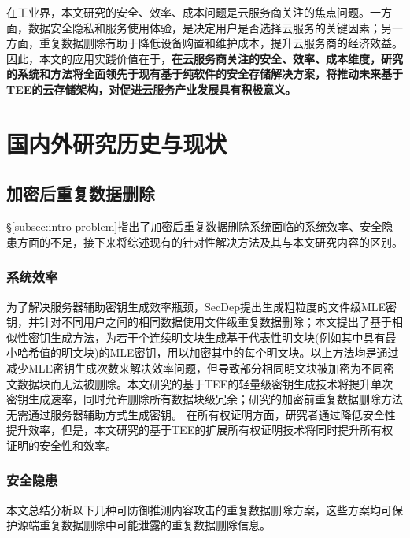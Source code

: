 在工业界，本文研究的安全、效率、成本问题是云服务商关注的焦点问题。一方面，数据安全隐私和服务使用体验，是决定用户是否选择云服务的关键因素；另一方面，重复数据删除有助于降低设备购置和维护成本，提升云服务商的经济效益。因此，本文的应用实践价值在于，\textbf{在云服务商关注的安全、效率、成本维度，研究的系统和方法将全面领先于现有基于纯软件的安全存储解决方案，将推动未来基于TEE的云存储架构，对促进云服务产业发展具有积极意义。}

\section{国内外研究历史与现状}
\label{sec:compare}

\subsection{加密后重复数据删除}
\label{subsec:compare-deduplication}

\S\ref{subsec:intro-problem}指出了加密后重复数据删除系统面临的系统效率、安全隐患方面的不足，接下来将综述现有的针对性解决方法及其与本文研究内容的区别。

\subsubsection{系统效率}
\label{subsubsec:compare-deduplication-performance}

为了解决服务器辅助密钥生成效率瓶颈，SecDep\cite{zhou2015secdep}提出生成粗粒度的文件级MLE密钥，并针对不同用户之间的相同数据使用文件级重复数据删除；本文提出了基于相似性密钥生成方法\cite{qin17}，为若干个连续明文块生成基于代表性明文块(例如其中具有最小哈希值的明文块)的MLE密钥，用以加密其中的每个明文块。以上方法均是通过减少MLE密钥生成次数来解决效率问题，但导致部分相同明文块被加密为不同密文数据块而无法被删除。本文研究的基于TEE的轻量级密钥生成技术将提升单次密钥生成速率，同时允许删除所有数据块级冗余；研究的加密前重复数据删除方法无需通过服务器辅助方式生成密钥。
在所有权证明方面，研究者通过降低安全性提升效率\cite{xu2013weak,pietro12}，但是，本文研究的基于TEE的扩展所有权证明技术将同时提升所有权证明的安全性和效率。

\subsubsection{安全隐患}
\label{subsubsec:compare-deduplication-security}

本文总结分析以下几种可防御推测内容攻击的重复数据删除方案，这些方案均可保护源端重复数据删除中可能泄露的重复数据删除信息。

